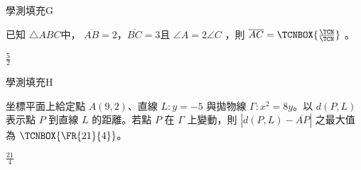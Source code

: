 \begin{QUESTIONS}
\begin{QUESTION}
        \begin{QSOLLIST}
        \end{QSOLLIST}
        \begin{QEMPTYSPACE}
        \end{QEMPTYSPACE}
    \end{QUESTION}
    \begin{QUESTION}
        \begin{ExamInfo}{99}{學測}{填充}{G}
        \end{ExamInfo}
        \begin{ExamAnsRateInfo}{25}{58}{14}{3}
        \end{ExamAnsRateInfo}
        \begin{QBODY}
            已知 $\triangle ABC$中， $\overline{AB}=2$，$\overline{BC}=3$且 $\angle A=2 \angle C$ ，則 $\overline{AC}=\TCNBOX{\frac{\TCN}{\TCN}}$ 。
        \end{QBODY}
        \begin{QFROMS}
        \end{QFROMS}
        \begin{QTAGS}\end{QTAGS}
        \begin{QANS}
            $\frac{5}{2}$
        \end{QANS}
        \begin{QSOLLIST}
        \end{QSOLLIST}
        \begin{QEMPTYSPACE}
        \end{QEMPTYSPACE}
    \end{QUESTION}
    \begin{QUESTION}
        \begin{ExamInfo}{99}{學測}{填充}{H}
        \end{ExamInfo}
        \begin{ExamAnsRateInfo}{10}{27}{2}{1}
        \end{ExamAnsRateInfo}
        \begin{QBODY}
            坐標平面上給定點 $A(9,2)$、直線 $L:y=-5$ 與拋物線 $\Gamma:x^2 =8y$。以 $d(P,L)$ 表示點 $P$ 到直線 $L$ 的距離。若點 $P$ 在 $\Gamma$ 上變動，則 $|d(P,L)-\overline{AP}|$ 之最大值為 $\TCNBOX{\FR{21}{4}}$。
        \end{QBODY}
        \begin{QFROMS}
        \end{QFROMS}
        \begin{QTAGS}\end{QTAGS}
        \begin{QANS}
            $\frac{21}{4}$
        \end{QANS}
        \begin{QSOLLIST}
        \end{QSOLLIST}
        \begin{QEMPTYSPACE}
        \end{QEMPTYSPACE}
    \end{QUESTION}
\end{QUESTIONS}
